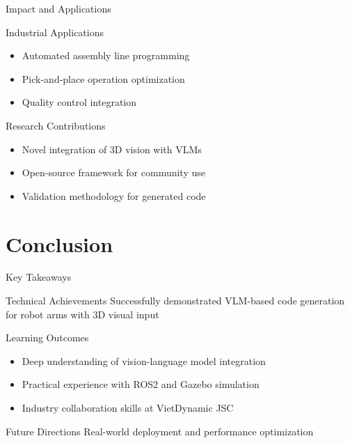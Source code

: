 \documentclass{beamer}
\begin{document}
\begin{frame}{Impact and Applications}
    \begin{block}{Industrial Applications}
        \begin{itemize}
            \item Automated assembly line programming
            \item Pick-and-place operation optimization
            \item Quality control integration
        \end{itemize}
    \end{block}
    
    \begin{block}{Research Contributions}
        \begin{itemize}
            \item Novel integration of 3D vision with VLMs
            \item Open-source framework for community use
            \item Validation methodology for generated code
        \end{itemize}
    \end{block}
    
\end{frame}
                                     
\section{Conclusion}

\begin{frame}{Key Takeaways}
    \begin{block}{Technical Achievements}
        Successfully demonstrated VLM-based code generation for robot arms with 3D visual input
    \end{block}
    
    \begin{block}{Learning Outcomes}
        \begin{itemize}
            \item Deep understanding of vision-language model integration
            \item Practical experience with ROS2 and Gazebo simulation
            \item Industry collaboration skills at VietDynamic JSC
        \end{itemize}
    \end{block}
    
    \begin{alertblock}{Future Directions}
        Real-world deployment and performance optimization
    \end{alertblock}
    
\end{frame}
\end{document}
